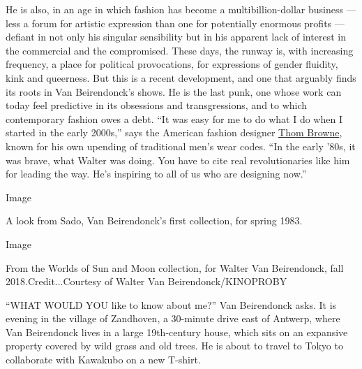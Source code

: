 He is also, in an age in which fashion has become a multibillion-dollar
business --- less a forum for artistic expression than one for
potentially enormous profits --- defiant in not only his singular
sensibility but in his apparent lack of interest in the commercial and
the compromised. These days, the runway is, with increasing frequency, a
place for political provocations, for expressions of gender fluidity,
kink and queerness. But this is a recent development, and one that
arguably finds its roots in Van Beirendonck's shows. He is the last
punk, one whose work can today feel predictive in its obsessions and
transgressions, and to which contemporary fashion owes a debt. ``It was
easy for me to do what I do when I started in the early 2000s,'' says
the American fashion designer
\href{https://www.nytimes3xbfgragh.onion/topic/person/thom-browne}{Thom
Browne}, known for his own upending of traditional men's wear codes.
``In the early '80s, it was brave, what Walter was doing. You have to
cite real revolutionaries like him for leading the way. He's inspiring
to all of us who are designing now.''

Image

A look from Sado, Van Beirendonck's first collection, for spring 1983.

Image

From the Worlds of Sun and Moon collection, for Walter Van Beirendonck,
fall 2018.Credit...Courtesy of Walter Van Beirendonck/KINOPROBY

``WHAT WOULD YOU like to know about me?'' Van Beirendonck asks. It is
evening in the village of Zandhoven, a 30-minute drive east of Antwerp,
where Van Beirendonck lives in a large 19th-century house, which sits on
an expansive property covered by wild grass and old trees. He is about
to travel to Tokyo to collaborate with Kawakubo on a new T-shirt.

